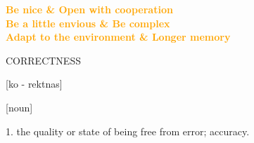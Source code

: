 \documentclass{beamer}
\begin{document}
\begin{frame}
    \begin{center}
    \large{\textbf{\textcolor{orange}{Be nice \& Open with cooperation}}} \vspace{1cm} \\ \pause
    \large{\textbf{\textcolor{orange}{Be a little envious \& Be complex}}} \vspace{1cm} \\ \pause
    \large{\textbf{\textcolor{orange}{Adapt to the environment \& Longer memory}}}
    \end{center}
\end{frame}

\begin{frame}
    \begin{center}
    \begin{minipage}{.5\textwidth}
        \LARGE{CORRECTNESS}
    \end{minipage}
    \begin{minipage}{.3\textwidth}
        \normalsize{[ko - rektnas]}
    \end{minipage}
    \vspace{.5cm}

    \hspace{-8cm} \normalsize{[noun]}\\
    \end{center}
    \hspace{.8cm} \normalsize{1. the quality or state of being free from error; accuracy.}

\end{frame}
\end{document}
